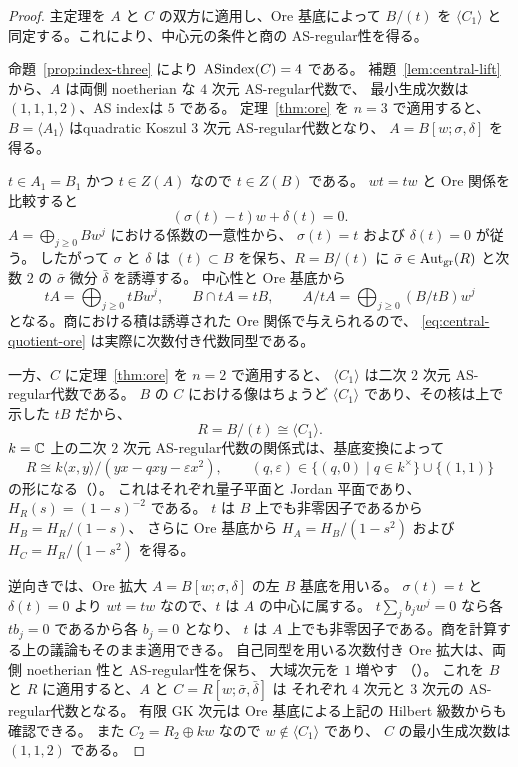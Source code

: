 \begin{proof}
主定理を $A$ と $C$ の双方に適用し、Ore 基底によって
$B/(t)$ を $\langle C_1\rangle$ と同定する。これにより、中心元の条件と商の AS-regular性を得る。

命題~\ref{prop:index-three} により $\operatorname{ASindex}(C)=4$ である。
補題~\ref{lem:central-lift} から、$A$ は両側 noetherian な $4$ 次元 AS-regular代数で、
最小生成次数は $(1,1,1,2)$、AS indexは $5$ である。
定理~\ref{thm:ore} を $n=3$ で適用すると、
$B=\langle A_1\rangle$ はquadratic Koszul $3$ 次元 AS-regular代数となり、
$A=B[w;\sigma,\delta]$ を得る。

$t\in A_1=B_1$ かつ $t\in Z(A)$ なので $t\in Z(B)$ である。
$wt=tw$ と Ore 関係を比較すると
\[
   (\sigma(t)-t)w+\delta(t)=0.
\]
$A=\bigoplus_{j\ge0}Bw^j$ における係数の一意性から、
$\sigma(t)=t$ および $\delta(t)=0$ が従う。
したがって $\sigma$ と $\delta$ は $(t)\subset B$ を保ち、$R=B/(t)$ に
$\bar\sigma\in\operatorname{Aut}_{\mathrm{gr}}(R)$ と次数 $2$ の $\bar\sigma$ 微分 $\bar\delta$ を誘導する。
中心性と Ore 基底から
\[
  tA=\bigoplus_{j\ge0}tBw^j,\qquad
  B\cap tA=tB,\qquad
  A/tA=\bigoplus_{j\ge0}(B/tB)w^j
\]
となる。商における積は誘導された Ore 関係で与えられるので、
\eqref{eq:central-quotient-ore} は実際に次数付き代数同型である。

一方、$C$ に定理~\ref{thm:ore} を $n=2$ で適用すると、
$\langle C_1\rangle$ は二次 $2$ 次元 AS-regular代数である。
$B$ の $C$ における像はちょうど $\langle C_1\rangle$ であり、その核は上で示した $tB$ だから、
\[
 R=B/(t)\cong\langle C_1\rangle.
\]
$k=\mathbb C$ 上の二次 $2$ 次元 AS-regular代数の関係式は、基底変換によって
\begin{equation}\label{eq:central-plane}
  R\cong k\langle x,y\rangle/(yx-qxy-\varepsilon x^2),
  \qquad
  (q,\varepsilon)\in
  \{(q,0)\mid q\in k^\times\}\cup\{(1,1)\}
\end{equation}
の形になる（\cite[Section~2, following Corollary~2.2]{RZ}）。
これはそれぞれ量子平面と Jordan 平面であり、$H_R(s)=(1-s)^{-2}$ である。
$t$ は $B$ 上でも非零因子であるから $H_B=H_R/(1-s)$、
さらに Ore 基底から $H_A=H_B/(1-s^2)$ および $H_C=H_R/(1-s^2)$ を得る。

逆向きでは、Ore 拡大 $A=B[w;\sigma,\delta]$ の左 $B$ 基底を用いる。
$\sigma(t)=t$ と $\delta(t)=0$ より $wt=tw$ なので、$t$ は $A$ の中心に属する。
$t\sum_jb_jw^j=0$ なら各 $tb_j=0$ であるから各 $b_j=0$ となり、
$t$ は $A$ 上でも非零因子である。商を計算する上の議論もそのまま適用できる。
自己同型を用いる次数付き Ore 拡大は、両側 noetherian 性と AS-regular性を保ち、
大域次元を $1$ 増やす
（\cite[Sections~1.2--1.3 and Theorem~3.3]{LWW}）。
これを $B$ と $R$ に適用すると、$A$ と $C=R[w;\bar\sigma,\bar\delta]$ は
それぞれ $4$ 次元と $3$ 次元の AS-regular代数となる。
有限 GK 次元は Ore 基底による上記の Hilbert 級数からも確認できる。
また $C_2=R_2\oplus kw$ なので $w\notin\langle C_1\rangle$ であり、
$C$ の最小生成次数は $(1,1,2)$ である。
\end{proof}


